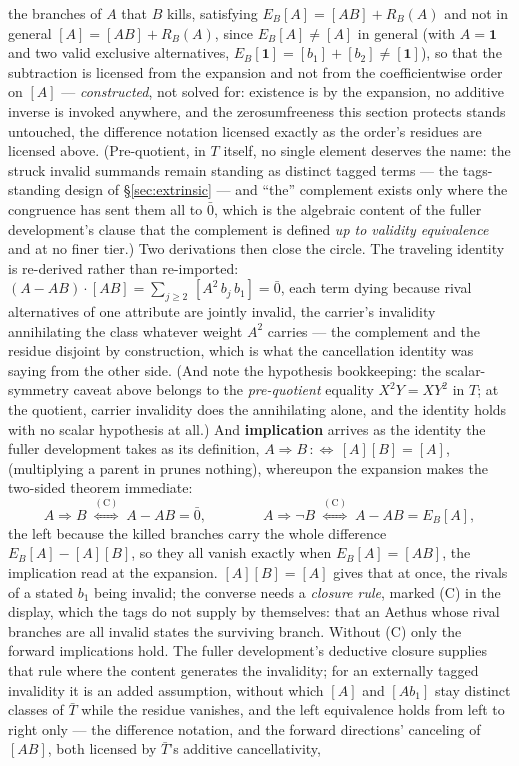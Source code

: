 the branches of $A$ that $B$ kills, satisfying $E_B[A] = [AB] + R_B(A)$ and not in general $[A] = [AB] + R_B(A)$, since $E_B[A] \ne [A]$ in general (with $A = \mathbf{1}$ and two valid exclusive alternatives, $E_B[\mathbf{1}] = [b_1] + [b_2] \ne [\mathbf{1}]$), so that the subtraction is licensed from the expansion and not from the coefficientwise order on $[A]$ --- \emph{constructed}, not solved for: existence is by the expansion, no additive inverse is invoked anywhere, and the zerosumfreeness this section protects stands untouched, the difference notation licensed exactly as the order's residues are licensed above. (Pre-quotient, in $T$ itself, no single element deserves the name: the struck invalid summands remain standing as distinct tagged terms --- the tags-standing design of \S\ref{sec:extrinsic} --- and ``the'' complement exists only where the congruence has sent them all to $\bar{0}$, which is the algebraic content of the fuller development's clause that the complement is defined \emph{up to validity equivalence} and at no finer tier.) Two derivations then close the circle. The traveling identity is re-derived rather than re-imported: $(A - AB)\cdot[AB] = \sum_{j \geq 2}\,[A^{2}\, b_j\, b_1] = \bar{0}$, each term dying because rival alternatives of one attribute are jointly invalid, the carrier's invalidity annihilating the class whatever weight $A^{2}$ carries --- the complement and the residue disjoint by construction, which is what the cancellation identity was saying from the other side. (And note the hypothesis bookkeeping: the scalar-symmetry caveat above belongs to the \emph{pre-quotient} equality $X^2Y = XY^2$ in $T$; at the quotient, carrier invalidity does the annihilating alone, and the identity holds with no scalar hypothesis at all.) And \textbf{implication} arrives as the identity the fuller development takes as its definition, $A \Rightarrow B \,:\Longleftrightarrow\, [A][B] = [A]$, (multiplying a parent in prunes nothing), whereupon the expansion makes the two-sided theorem immediate: \begin{equation} A \Rightarrow B \;\overset{(\mathrm{C})}{\Longleftrightarrow}\; A - AB = \bar{0}, \qquad\qquad A \Rightarrow \lnot B \;\overset{(\mathrm{C})}{\Longleftrightarrow}\; A - AB = E_B[A], \end{equation} the left because the killed branches carry the whole difference $E_B[A] - [A][B]$, so they all vanish exactly when $E_B[A] = [AB]$, the implication read at the expansion. $[A][B] = [A]$ gives that at once, the rivals of a stated $b_1$ being invalid; the converse needs a \emph{closure rule}, marked (C) in the display, which the tags do not supply by themselves: that an Aethus whose rival branches are all invalid states the surviving branch. Without (C) only the forward implications hold. The fuller development's deductive closure supplies that rule where the content generates the invalidity; for an externally tagged invalidity it is an added assumption, without which $[A]$ and $[A b_1]$ stay distinct classes of $\bar{T}$ while the residue vanishes, and the left equivalence holds from left to right only --- the difference notation, and the forward directions' canceling of $[AB]$, both licensed by $\bar{T}$'s additive cancellativity, 